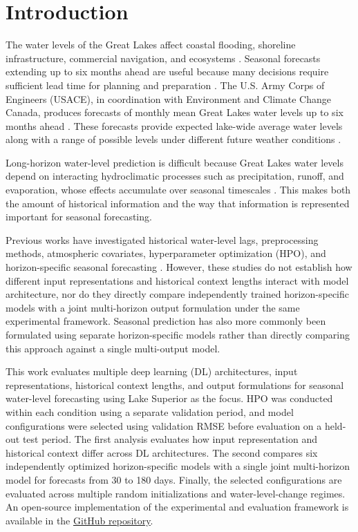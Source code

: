 \documentclass[conference]{IEEEtran}
\begin{document}
\section{Introduction}

The water levels of the Great Lakes affect coastal flooding, shoreline infrastructure, commercial navigation, and ecosystems \cite{fry2020operational}. Seasonal forecasts extending up to six months ahead are useful because many decisions require sufficient lead time for planning and preparation \cite{fry2020operational}. The U.S. Army Corps of Engineers (USACE), in coordination with Environment and Climate Change Canada, produces forecasts of monthly mean Great Lakes water levels up to six months ahead \cite{fry2020operational}. These forecasts provide expected lake-wide average water levels along with a range of possible levels under different future weather conditions \cite{fry2020operational}.

Long-horizon water-level prediction is difficult because Great Lakes water levels depend on interacting hydroclimatic processes such as precipitation, runoff, and evaporation, whose effects accumulate over seasonal timescales \cite{fry2020operational,barzegar2026interpretable,chen2025dualtransformer}. This makes both the amount of historical information and the way that information is represented important for seasonal forecasting.

Previous works have investigated historical water-level lags, preprocessing methods, atmospheric covariates, hyperparameter optimization (HPO), and horizon-specific seasonal forecasting \cite{wang2020lakeerie,kurt2024greatlakes,barzegar2021cnn,barzegar2026interpretable,chen2025dualtransformer}. However, these studies do not establish how different input representations and historical context lengths interact with model architecture, nor do they directly compare independently trained horizon-specific models with a joint multi-horizon output formulation under the same experimental framework. Seasonal prediction has also more commonly been formulated using separate horizon-specific models rather than directly comparing this approach against a single multi-output model.

This work evaluates multiple deep learning (DL) architectures, input representations, historical context lengths, and output formulations for seasonal water-level forecasting using Lake Superior as the focus. HPO was conducted within each condition using a separate validation period, and model configurations were selected using validation RMSE before evaluation on a held-out test period. The first analysis evaluates how input representation and historical context differ across DL architectures. The second compares six independently optimized horizon-specific models with a single joint multi-horizon model for forecasts from 30 to 180 days. Finally, the selected configurations are evaluated across multiple random initializations and water-level-change regimes. An open-source implementation of the experimental and evaluation framework is available in the
\href{https://github.com/Alexander-Stinnett/oceans-2026-great-lakes-water-level-forecasting}{\underline{GitHub repository}}.
\end{document}
